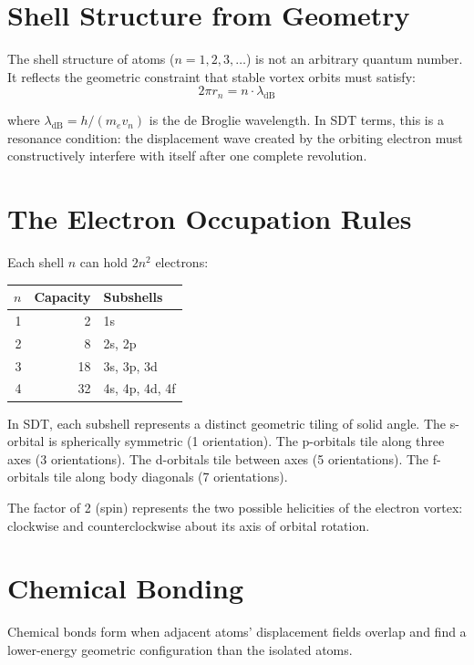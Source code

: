 \section{Shell Structure from Geometry}

The shell structure of atoms ($n = 1, 2, 3, \ldots$) is not an arbitrary quantum number. It reflects the geometric constraint that stable vortex orbits must satisfy:
\begin{equation}
  2\pi r_n = n \cdot \lambda_{\text{dB}}
\end{equation}

where $\lambda_{\text{dB}} = h/(m_e v_n)$ is the de Broglie wavelength. In SDT terms, this is a resonance condition: the displacement wave created by the orbiting electron must constructively interfere with itself after one complete revolution.


\section{The Electron Occupation Rules}

Each shell $n$ can hold $2n^2$ electrons:
\begin{center}
\begin{tabular}{rrl}
\toprule
$n$ & Capacity & \textbf{Subshells} \\
\midrule
1 & 2   & 1s \\
2 & 8   & 2s, 2p \\
3 & 18  & 3s, 3p, 3d \\
4 & 32  & 4s, 4p, 4d, 4f \\
\bottomrule
\end{tabular}
\end{center}

In SDT, each subshell represents a distinct geometric tiling of solid angle. The s-orbital is spherically symmetric (1 orientation). The p-orbitals tile along three axes (3 orientations). The d-orbitals tile between axes (5 orientations). The f-orbitals tile along body diagonals (7 orientations).

The factor of 2 (spin) represents the two possible helicities of the electron vortex: clockwise and counterclockwise about its axis of orbital rotation.


\section{Chemical Bonding}

Chemical bonds form when adjacent atoms' displacement fields overlap and find a lower-energy geometric configuration than the isolated atoms.

